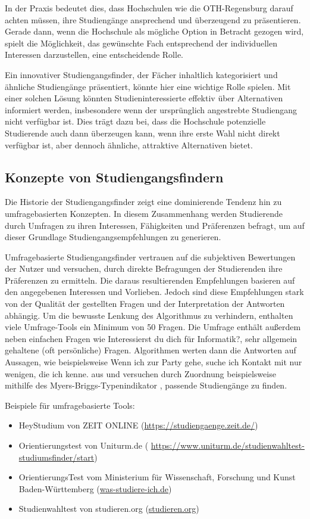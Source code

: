 In der Praxis bedeutet dies, dass Hochschulen wie die OTH-Regensburg darauf
achten müssen, ihre Studiengänge ansprechend und überzeugend zu präsentieren.
Gerade dann, wenn die Hochschule als mögliche Option in Betracht gezogen wird,
spielt die Möglichkeit, das gewünschte Fach entsprechend der individuellen
Interessen darzustellen, eine entscheidende Rolle.

Ein innovativer Studiengangsfinder, der Fächer inhaltlich kategorisiert und
ähnliche Studiengänge präsentiert, könnte hier eine wichtige Rolle spielen. Mit
einer solchen Lösung könnten Studieninteressierte effektiv über Alternativen
informiert werden, insbesondere wenn der ursprünglich angestrebte Studiengang
nicht verfügbar ist. Dies trägt dazu bei, dass die Hochschule potenzielle
Studierende auch dann überzeugen kann, wenn ihre erste Wahl nicht direkt
verfügbar ist, aber dennoch ähnliche, attraktive Alternativen bietet.


\subsection{Konzepte von Studiengangsfindern}
Die Historie der Studiengangsfinder zeigt eine dominierende Tendenz hin zu
umfragebasierten Konzepten. In diesem Zusammenhang werden Studierende durch
Umfragen zu ihren Interessen, Fähigkeiten und Präferenzen befragt, um auf dieser
Grundlage Studiengangsempfehlungen zu generieren.

Umfragebasierte Studiengangsfinder vertrauen auf die subjektiven Bewertungen
der Nutzer und versuchen, durch direkte Befragungen der Studierenden ihre
Präferenzen zu ermitteln. Die daraus resultierenden Empfehlungen basieren auf
den angegebenen Interessen und Vorlieben. Jedoch sind diese Empfehlungen stark
von der Qualität der gestellten Fragen und der Interpretation der Antworten
abhängig. Um die bewusste Lenkung des Algorithmus zu verhindern, enthalten viele
Umfrage-Tools ein Minimum von 50 Fragen. Die Umfrage enthält außerdem neben
einfachen Fragen wie \glqq Interessierst du dich für Informatik?\grqq{}, sehr
allgemein gehaltene (oft persönliche) Fragen. Algorithmen werten dann die
Antworten auf Aussagen, wie beispielsweise \glqq Wenn ich zur Party
gehe, suche ich Kontakt mit nur wenigen, die ich kenne.\grqq{} aus und versuchen
durch Zuordnung beispielsweise mithilfe des Myers-Briggs-Typenindikator
\parencite{myers-briggs}, passende Studiengänge zu finden. \parencite{uniturm}

Beispiele für umfragebasierte Tools:
\begin{itemize}
    \item HeyStudium von ZEIT ONLINE (\url{https://studiengaenge.zeit.de/})
    \item Orientierungstest von Uniturm.de (
        \url{https://www.uniturm.de/studienwahltest-studiumsfinder/start})
    \item OrientierungsTest vom Ministerium für Wissenschaft, Forschung und
        Kunst Baden-Württemberg (\url{was-studiere-ich.de})
    \item Studienwahltest von studieren.org (\url{studieren.org})
\end{itemize}

